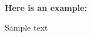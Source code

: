 \documentclass{article}
\newenvironment{example}{\textbf{Here is an example:}\par}{}
\begin{document}
\begin{example}
  Sample text
\end{example}
\end{document}
